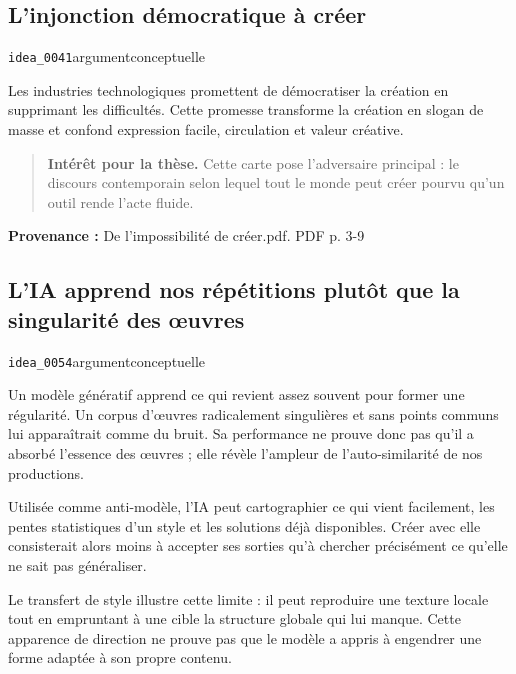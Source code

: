\documentclass[10pt,a4paper]{article}
\begin{document}
\subsection{L'injonction démocratique à créer}
{\small\color{metadata} \texttt{idea\_0041}\quad\textbullet\quad argument\quad\textbullet\quad conceptuelle\par}

Les industries technologiques promettent de démocratiser la création en supprimant les difficultés. Cette promesse transforme la création en slogan de masse et confond expression facile, circulation et valeur créative.

\begin{quote}
\textbf{Intérêt pour la thèse.} Cette carte pose l'adversaire principal : le discours contemporain selon lequel tout le monde peut créer pourvu qu'un outil rende l'acte fluide.
\end{quote}
{\footnotesize\color{metadata}\textbf{Provenance :} De l'impossibilité de créer.pdf. PDF p. 3-9\par}

\subsection{L'IA apprend nos répétitions plutôt que la singularité des œuvres}
{\small\color{metadata} \texttt{idea\_0054}\quad\textbullet\quad argument\quad\textbullet\quad conceptuelle\par}

Un modèle génératif apprend ce qui revient assez souvent pour former une régularité. Un corpus d'œuvres radicalement singulières et sans points communs lui apparaîtrait comme du bruit. Sa performance ne prouve donc pas qu'il a absorbé l'essence des œuvres ; elle révèle l'ampleur de l'auto-similarité de nos productions.

Utilisée comme anti-modèle, l'IA peut cartographier ce qui vient facilement, les pentes statistiques d'un style et les solutions déjà disponibles. Créer avec elle consisterait alors moins à accepter ses sorties qu'à chercher précisément ce qu'elle ne sait pas généraliser.

Le transfert de style illustre cette limite : il peut reproduire une texture locale tout en empruntant à une cible la structure globale qui lui manque. Cette apparence de direction ne prouve pas que le modèle a appris à engendrer une forme adaptée à son propre contenu.
\end{document}
